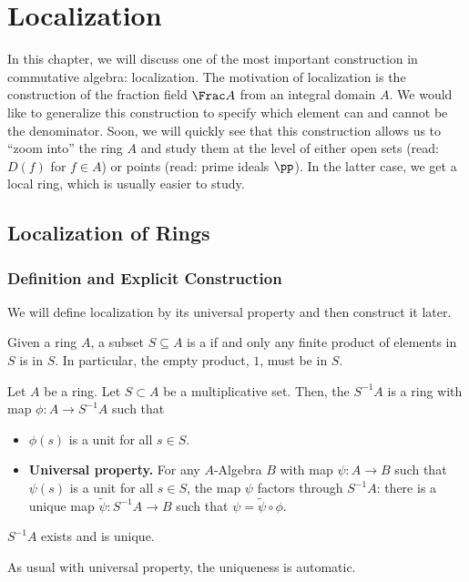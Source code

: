\chapter{Localization}
\label{chap:localization}
In this chapter, we will discuss one of the most
important construction in commutative algebra: localization.
The motivation of localization is the construction of
the fraction field $\Frac A$ from an integral domain $A$.
We would like to generalize this construction
to specify which element can and cannot be
the denominator.
Soon, we will quickly see that this construction
allows us to ``zoom into'' the ring $A$ and study them
at the level of either open sets (read: $D(f)$
for $f\in A$) or points (read: prime ideals $\pp$).
In the latter case, we get a local ring,
which is usually easier to study.

\section{Localization of Rings}
\subsection{Definition and Explicit Construction}
We will define localization by
its universal property and then construct it later.
\begin{definition}
    Given a ring $A$, a subset $S\subseteq A$ is 
    a  
    if and only any finite product of elements 
    in $S$ is in $S$.
    In particular, the empty product, $1$, must be in $S$.
\end{definition}
\begin{definition}[Localization]
    Let $A$ be a ring.
    Let $S\subset A$ be a multiplicative set. Then,
    the  $S^{-1}A$ is a ring with
    map $\phi : A\to S^{-1}A$ such that
    \begin{itemize}
	\item $\phi(s)$ is a unit for all $s\in S$.
	\item \textbf{Universal property.}
        For any $A$-Algebra $B$ with map
	$\psi : A\to B$ such that $\psi(s)$ is a unit
	for all $s\in S$, the map $\psi$ factors through
	$S^{-1}A$: there is a unique map $
	\widetilde\psi : S^{-1}A\to B$
	such that $\psi = \widetilde\psi \circ\phi$.
    \begin{center}
    \end{center}
    \end{itemize}
\end{definition}
\begin{theorem}
    $S^{-1}A$ exists and is unique.
\end{theorem}
As usual with universal property, the uniqueness
is automatic.

